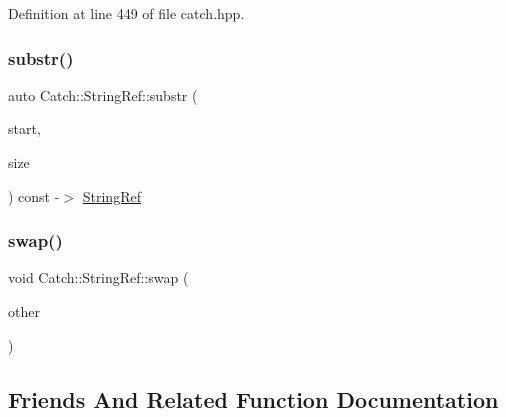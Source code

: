 Definition at line 449 of file catch.\+hpp.

\mbox{\label{class_catch_1_1_string_ref_a248568b467cf6599320903ae613c8eee}} 
\subsubsection{\texorpdfstring{substr()}{substr()}}
{\footnotesize\ttfamily auto Catch\+::\+String\+Ref\+::substr (\begin{DoxyParamCaption}\item[{\mbox{\hyperlink{class_catch_1_1_string_ref_a06b4db8fc82b197004291cf370b2ba7c}{size\+\_\+type}}}]{start,  }\item[{\mbox{\hyperlink{class_catch_1_1_string_ref_a06b4db8fc82b197004291cf370b2ba7c}{size\+\_\+type}}}]{size }\end{DoxyParamCaption}) const -\/$>$  \mbox{\hyperlink{class_catch_1_1_string_ref}{String\+Ref}}\hspace{0.3cm}{\ttfamily [noexcept]}}

\mbox{\label{class_catch_1_1_string_ref_a8a843e39ad3560d10a80524ed926ed63}} 
\subsubsection{\texorpdfstring{swap()}{swap()}}
{\footnotesize\ttfamily void Catch\+::\+String\+Ref\+::swap (\begin{DoxyParamCaption}\item[{\mbox{\hyperlink{class_catch_1_1_string_ref}{String\+Ref}} \&}]{other }\end{DoxyParamCaption})\hspace{0.3cm}{\ttfamily [noexcept]}}



\subsection{Friends And Related Function Documentation}
\mbox{\label{class_catch_1_1_string_ref_a420e64e1652de1b0d427775781b018f5}} 
